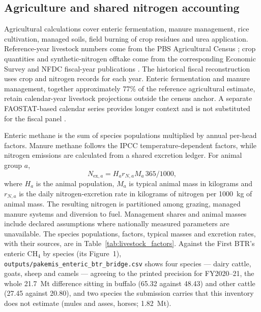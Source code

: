 \documentclass[essd]{copernicus}
\begin{document}
\subsection{Agriculture and shared nitrogen accounting}
\label{sec:agriculture_methods}

Agricultural calculations cover enteric fermentation, manure management, rice cultivation, managed soils, field burning of crop residues and urea application. Reference-year livestock numbers come from the PBS Agricultural Census \citep{PBSAgri2026}; crop quantities and synthetic-nitrogen offtake come from the corresponding Economic Survey and NFDC fiscal-year publications \citep{MoF2024,NFDC2024}. The historical fiscal reconstruction uses crop and nitrogen records for each year. Enteric fermentation and manure management, together approximately 77\% of the reference agricultural estimate, retain calendar-year livestock projections outside the census anchor. A separate FAOSTAT-based calendar series provides longer context and is not substituted for the fiscal panel \citep{FAOSTAT2025}.

Enteric methane is the sum of species populations multiplied by annual per-head factors. Manure methane follows the IPCC temperature-dependent factors, while nitrogen emissions are calculated from a shared excretion ledger. For animal group $a$,
\begin{equation}
 N_{\mathrm{ex},a}=H_a r_{N,a} M_a\,365/1000,
 \label{eq:nitrogen_excretion}
\end{equation}
where $H_a$ is the animal population, $M_a$ is typical animal mass in kilograms and $r_{N,a}$ is the daily nitrogen-excretion rate in kilograms of nitrogen per 1000~kg of animal mass. The resulting nitrogen is partitioned among grazing, managed manure systems and diversion to fuel. Management shares and animal masses include declared assumptions where nationally measured parameters are unavailable. The species populations, factors, typical masses and excretion rates, with their sources, are in Table~\ref{tab:livestock_factors}. Against the First BTR's enteric CH$_4$ by species (its Figure~1), \texttt{outputs/pakemis\_enteric\_btr\_bridge.csv} shows four species --- dairy cattle, goats, sheep and camels --- agreeing to the printed precision for FY2020--21, the whole \SI{21.7}{\mega\tonne} difference sitting in buffalo (\num{65.32} against \num{48.43}) and other cattle (\num{27.45} against \num{20.80}), and two species the submission carries that this inventory does not estimate (mules and asses, horses; \SI{1.82}{\mega\tonne}).

\end{document}
